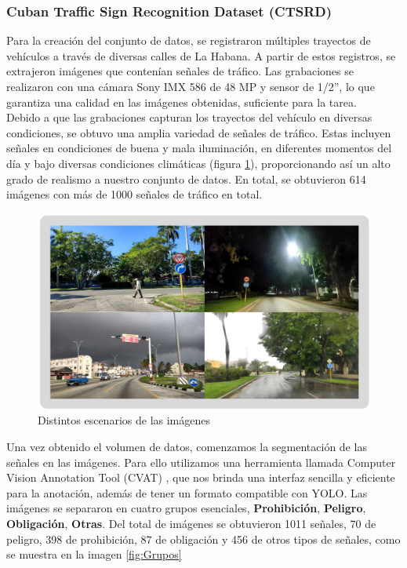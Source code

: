 \documentclass{article}
\begin{document}
\subsubsection{Cuban Traffic Sign Recognition Dataset (CTSRD)}
Para la creación del conjunto de datos, se registraron múltiples trayectos de vehículos a través de diversas calles de La Habana. A partir de estos registros, se extrajeron imágenes que contenían señales de tráfico. Las grabaciones se realizaron con una cámara Sony IMX 586 de 48 MP y sensor de 1/2”, lo que garantiza una calidad en las imágenes obtenidas, suficiente para la tarea.\\
Debido a que las grabaciones capturan los trayectos del vehículo en diversas condiciones, se obtuvo una amplia variedad de señales de tráfico. Estas incluyen señales en condiciones de buena y mala iluminación, en diferentes momentos del día y bajo diversas condiciones climáticas (figura \ref{fig:scenarios}), proporcionando así un alto grado de realismo a nuestro conjunto de datos. En total, se obtuvieron 614 imágenes con más de 1000 señales de tráfico en total.


\begin{figure}[h]
\centering
\includegraphics[width=1.0\textwidth]{resources/stages.png}
\caption{Distintos escenarios de las imágenes}
\label{fig:scenarios}
\end{figure}


Una vez obtenido el volumen de datos, comenzamos la segmentación de las señales en las imágenes. Para ello utilizamos una herramienta llamada Computer Vision Annotation Tool (CVAT) \cite{ref10}, que nos brinda una interfaz sencilla y eficiente para la anotación, además de tener un formato compatible con YOLO. Las imágenes se separaron en cuatro grupos esenciales, \textbf{Prohibición}, \textbf{Peligro}, \textbf{Obligación}, \textbf{Otras}. Del total de imágenes se obtuvieron 1011 señales, 70 de peligro, 398 de prohibición, 87 de obligación y 456 de otros tipos de señales, como se muestra en la imagen \ref{fig:Grupos}
\end{document}
